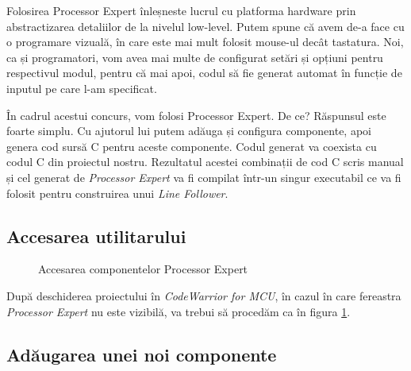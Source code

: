 Folosirea Processor Expert înleșneste lucrul cu platforma hardware prin abstractizarea detaliilor de la nivelul low-level. Putem spune că avem de-a face cu o programare vizuală, în care este mai mult folosit mouse-ul decât tastatura. Noi, ca și programatori, vom avea mai multe de configurat setări și opțiuni pentru respectivul modul, pentru că mai apoi, codul să fie generat automat în funcție de inputul pe care l-am specificat. 

În cadrul acestui concurs, vom folosi Processor Expert. De ce? Răspunsul este foarte simplu. Cu ajutorul lui putem adăuga și configura componente, apoi genera cod sursă C pentru aceste componente. Codul generat va coexista cu codul C din proiectul nostru. Rezultatul acestei combinații de cod C scris manual și cel generat de \textit{Processor Expert} va fi compilat într-un singur executabil ce va fi folosit pentru construirea unui \textit{Line Follower}.

\subsection{Accesarea utilitarului}

\begin{figure}
    \vspace{-60pt}
    \vspace{-25pt}
    \caption{\label{fig:CodeWarrior-ProcessorExpert} Accesarea componentelor Processor Expert}
    \vspace{-50pt}
\end{figure}

După deschiderea proiectului în \textit{CodeWarrior for MCU}, în cazul în care fereastra \textit{Processor Expert} nu este vizibilă, va trebui să procedăm ca în figura \ref{fig:CodeWarrior-ProcessorExpert}.

\subsection{Adăugarea unei noi componente}

